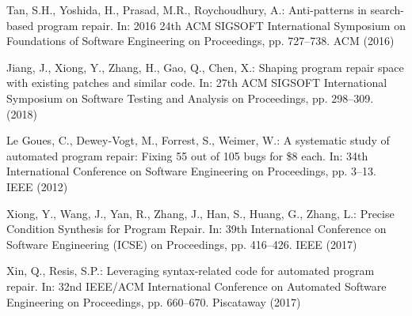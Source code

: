 \documentclass[runningheads]{llncs}
\begin{document}
\begin{thebibliography}{8}
Tan, S.H., Yoshida, H., Prasad, M.R., Roychoudhury, A.: Anti-patterns in search-based program repair. In: 2016 24th ACM SIGSOFT International Symposium on Foundations of Software Engineering
on Proceedings, pp. 727--738. ACM (2016)

Jiang, J., Xiong, Y., Zhang, H., Gao, Q., Chen, X.: Shaping program repair space with existing patches and similar code. In: 27th ACM SIGSOFT International Symposium on Software Testing and Analysis
on Proceedings, pp. 298--309. (2018)

Le Goues, C., Dewey-Vogt, M., Forrest, S., Weimer, W.: A systematic study of automated program repair: Fixing 55 out of 105 bugs for \$8 each. In: 34th International Conference on Software Engineering
on Proceedings, pp. 3--13. IEEE (2012)

Xiong, Y., Wang, J., Yan, R., Zhang, J., Han, S., Huang, G., Zhang, L.: Precise Condition Synthesis for Program Repair. In: 39th International Conference on Software Engineering (ICSE)
on Proceedings, pp. 416--426. IEEE (2017)

Xin, Q., Resis, S.P.: Leveraging syntax-related code for automated program repair. In: 32nd IEEE/ACM International Conference on Automated Software Engineering
on Proceedings, pp. 660--670. Piscataway (2017)





\end{thebibliography}
\end{document}
